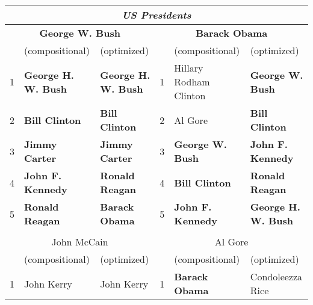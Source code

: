 \documentclass[a4paper,10pt]{article}
\begin{document}
\begin{table*} 
\begin{tabular}{lll | lll} 
\multicolumn{6}{c}{ \emph{US Presidents} } \\ \hline\hline
 \multicolumn{3}{c}{\small \textbf{George W. Bush}} & \multicolumn{3}{c}{\small \textbf{Barack Obama}}  \\  \hline
 \multicolumn{1}{l}{\small } & \multicolumn{1}{l}{\small \textbf{} (compositional)} & \multicolumn{1}{l|}{\small \textbf{} (optimized)} & \multicolumn{1}{l}{\small } & \multicolumn{1}{l}{\small \textbf{} (compositional)} & \multicolumn{1}{l}{\small \textbf{} (optimized)}\\ \hline 
  {\scriptsize 1 } & { \scriptsize \textbf{George H. W. Bush} } & { \scriptsize \textbf{George H. W. Bush}} &  {\scriptsize 1 } & { \scriptsize Hillary Rodham Clinton } & { \scriptsize \textbf{George W. Bush}} \\ 
 {\scriptsize 2 } & { \scriptsize \textbf{Bill Clinton} } & { \scriptsize \textbf{Bill Clinton}} &  {\scriptsize 2 } & { \scriptsize Al Gore } & { \scriptsize \textbf{Bill Clinton}}\\ 
 {\scriptsize 3 } & { \scriptsize \textbf{Jimmy Carter} } & { \scriptsize \textbf{Jimmy Carter}} &  {\scriptsize 3 } & { \scriptsize \textbf{George W. Bush} } & { \scriptsize \textbf{John F. Kennedy}}\\ 
 {\scriptsize 4 } & { \scriptsize \textbf{John F. Kennedy} } & { \scriptsize \textbf{Ronald Reagan}} &  {\scriptsize 4 } & { \scriptsize \textbf{Bill Clinton} } & { \scriptsize \textbf{Ronald Reagan}}\\ 
 {\scriptsize 5 } & { \scriptsize \textbf{Ronald Reagan} } & { \scriptsize \textbf{Barack Obama}} &  {\scriptsize 5 } & { \scriptsize \textbf{John F. Kennedy} } & { \scriptsize \textbf{George H. W. Bush}}\\ \hline
 \\
 \multicolumn{3}{c}{\small John McCain} & \multicolumn{3}{c}{\small Al Gore}  \\ \hline
 \multicolumn{1}{l}{\small } & \multicolumn{1}{l}{\small \textbf{} (compositional)} & \multicolumn{1}{l|}{\small \textbf{} (optimized)} & \multicolumn{1}{l}{\small } & \multicolumn{1}{l}{\small \textbf{} (compositional)} & \multicolumn{1}{l}{\small \textbf{} (optimized)} \\ \hline 
 {\scriptsize 1 } & { \scriptsize John Kerry } & { \scriptsize John Kerry} &  {\scriptsize 1 } & { \scriptsize \textbf{Barack Obama} } & { \scriptsize Condoleezza Rice} \\

\end{tabular}
\end{table*}
\end{document}
